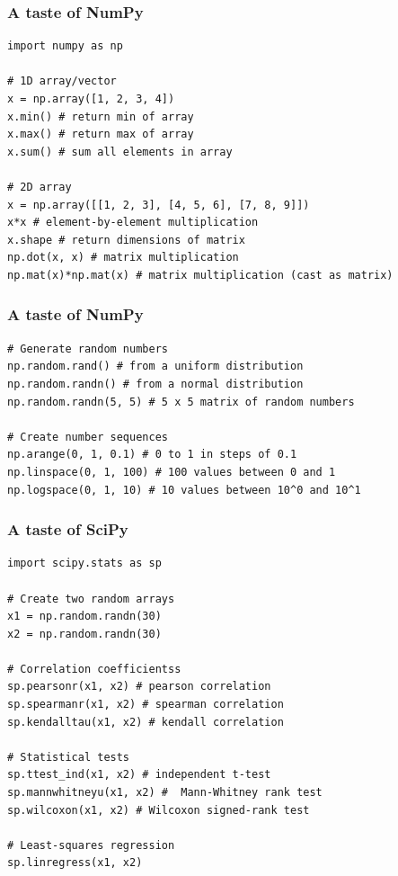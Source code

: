 \documentclass[xcolor=table]{beamer}
\begin{document}
\begin{frame}[fragile]
\frametitle{A taste of NumPy}

\begin{lstlisting}[style=python]
import numpy as np

# 1D array/vector
x = np.array([1, 2, 3, 4])
x.min() # return min of array 
x.max() # return max of array
x.sum() # sum all elements in array

# 2D array
x = np.array([[1, 2, 3], [4, 5, 6], [7, 8, 9]])
x*x # element-by-element multiplication
x.shape # return dimensions of matrix
np.dot(x, x) # matrix multiplication
np.mat(x)*np.mat(x) # matrix multiplication (cast as matrix)
\end{lstlisting}

\end{frame}

\begin{frame}[fragile]
\frametitle{A taste of NumPy}

\begin{lstlisting}[style=python]
# Generate random numbers
np.random.rand() # from a uniform distribution
np.random.randn() # from a normal distribution
np.random.randn(5, 5) # 5 x 5 matrix of random numbers

# Create number sequences
np.arange(0, 1, 0.1) # 0 to 1 in steps of 0.1
np.linspace(0, 1, 100) # 100 values between 0 and 1
np.logspace(0, 1, 10) # 10 values between 10^0 and 10^1
\end{lstlisting}

\end{frame}

\begin{frame}[fragile]
\frametitle{A taste of SciPy}

\begin{lstlisting}[style=python]
import scipy.stats as sp

# Create two random arrays
x1 = np.random.randn(30)
x2 = np.random.randn(30)

# Correlation coefficientss
sp.pearsonr(x1, x2) # pearson correlation
sp.spearmanr(x1, x2) # spearman correlation
sp.kendalltau(x1, x2) # kendall correlation

# Statistical tests
sp.ttest_ind(x1, x2) # independent t-test
sp.mannwhitneyu(x1, x2) #  Mann-Whitney rank test 
sp.wilcoxon(x1, x2) # Wilcoxon signed-rank test

# Least-squares regression
sp.linregress(x1, x2)
\end{lstlisting}

\end{frame}
\end{document}
